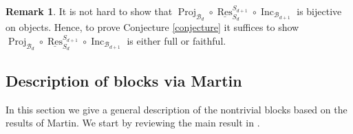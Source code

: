 \documentclass{amsart}
\theoremstyle{definition}
\newtheorem{remark}[theorem]{Remark}
\newcommand{\Inc}{\operatorname{Inc}}
\newcommand{\Proj}{\operatorname{Proj}}
\newcommand{\uRes}{\underline{\operatorname{Res}}}
\renewcommand{\1}{_{(1)}}
\renewcommand{\2}{_{(2)}}
\newcommand{\3}{_{(3)}}
\newcommand{\4}{_{(4)}}
\newcommand{\cat}{\mathcal}
\begin{document}
\begin{remark}  
It is not hard to show that $\Proj_{\cat{B}_d}\circ\uRes_{S_d}^{S_{d+1}}\circ\Inc_{\cat{B}_{d+1}}$ is bijective on objects.  Hence, to prove Conjecture \ref{conjecture} it suffices to show $\Proj_{\cat{B}_d}\circ\uRes_{S_d}^{S_{d+1}}\circ\Inc_{\cat{B}_{d+1}}$ is either full or faithful.  
\end{remark}





\subsection{Description of blocks via Martin}  In this section we give a general description of the nontrivial blocks based on the results of Martin.  We start by reviewing the main result in \cite{MR1399030}.
\end{document}
